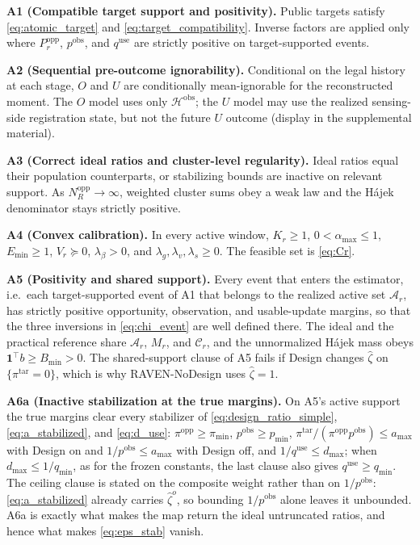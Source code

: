 \documentclass[letterpaper,journal]{IEEEtran}
\begin{document}
\noindent\textbf{A1 (Compatible target support and positivity).}
Public targets satisfy \eqref{eq:atomic_target} and
\eqref{eq:target_compatibility}.  Inverse factors are applied only where
$P_r^{\mathrm{opp}}$, $p^{\mathrm{obs}}$, and $q^{\mathrm{use}}$ are
strictly positive on target-supported events.

\noindent\textbf{A2 (Sequential pre-outcome ignorability).}
Conditional on the legal history at each stage, $O$ and $U$ are
conditionally mean-ignorable for the reconstructed moment.  The $O$ model
uses only $\mathcal{H}^{\mathrm{obs}}$; the $U$ model may use the realized
sensing-side registration state, but not the future $U$ outcome
(display in the supplemental material).

\noindent\textbf{A3 (Correct ideal ratios and cluster-level regularity).}
Ideal ratios equal their population counterparts, or stabilizing bounds are
inactive on relevant support.  As $N_R^{\mathrm{opp}}\rightarrow\infty$,
weighted cluster sums obey a weak law and the H\'ajek denominator stays
strictly positive.

\noindent\textbf{A4 (Convex calibration).}
In every active window, $K_r\ge1$, $0<\alpha_{\max}\le1$, $E_{\min}\ge1$,
$V_r\succeq0$, $\lambda_{\beta}>0$, and
$\lambda_g,\lambda_v,\lambda_s\ge0$.  The feasible set is \eqref{eq:Cr}.

\noindent\textbf{A5 (Positivity and shared support).}
Every event that enters the estimator, i.e.\ each target-supported event of
A1 that belongs to the realized active set $\mathcal{A}_r$, has strictly
positive opportunity, observation, and usable-update margins, so that the
three inversions in \eqref{eq:chi_event} are well defined there.  The ideal and
the practical reference share $\mathcal{A}_r$, $M_r$, and $\mathcal{C}_r$,
and the unnormalized H\'ajek mass obeys
$\mathbf{1}^{\top}b\ge B_{\min}>0$.  The shared-support clause of A5 fails
if Design changes $\widehat\zeta$ on $\{\pi^{\mathrm{tar}}=0\}$, which is why
RAVEN-NoDesign uses $\widehat\zeta=1$.

\noindent\textbf{A6a (Inactive stabilization at the true margins).}
On A5's active support the true margins clear every stabilizer of
\eqref{eq:design_ratio_simple}, \eqref{eq:a_stabilized}, and \eqref{eq:d_use}:
$\pi^{\mathrm{opp}}\ge\pi_{\min}$, $p^{\mathrm{obs}}\ge p_{\min}$,
$\pi^{\mathrm{tar}}/(\pi^{\mathrm{opp}}p^{\mathrm{obs}})\le a_{\max}$ with
Design on and $1/p^{\mathrm{obs}}\le a_{\max}$ with Design off, and
$1/q^{\mathrm{use}}\le d_{\max}$; when $d_{\max}\le1/q_{\min}$, as for the
frozen constants, the last clause also gives $q^{\mathrm{use}}\ge q_{\min}$.
The ceiling clause is stated on the composite weight rather than on
$1/p^{\mathrm{obs}}$: \eqref{eq:a_stabilized} already carries
$\widehat\zeta^{o}$, so bounding $1/p^{\mathrm{obs}}$ alone leaves it
unbounded.
A6a is exactly what makes the map return the ideal untruncated ratios, and
hence what makes \eqref{eq:eps_stab} vanish.
\end{document}
